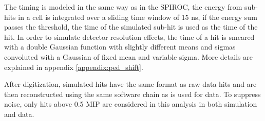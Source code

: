 The timing is modeled in the same way as in the SPIROC, the energy from sub-hits in a cell is integrated over a sliding time window of 15 ns, if the energy sum passes the threshold, the time of the simulated sub-hit is used as the time of the hit. In order to simulate detector resolution effects, the time of a hit is smeared with a double Gaussian function with slightly different means and sigmas convoluted with a Gaussian of fixed mean and variable sigma. More details are explained in appendix \ref{appendix:ped_shift}.

After digitization, simulated hits have the same format as raw data hits and are then reconstructed using the same software chain as is used for data. To suppress noise, only hits above 0.5 MIP are considered in this analysis in both simulation and data.
